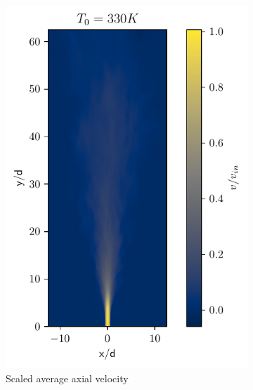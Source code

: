 \begin{figure}[htbp!]
\begin{subfigure}{0.25\textwidth}
	\includegraphics[scale=.65]{figures/Plots/vertical/330/v_scaled_vert_avg_330.pdf}
	\caption{Scaled average axial velocity} \label{330_v_3}
\end{subfigure}
\hfill
\begin{subfigure}{0.25\textwidth}
	\centering

\end{subfigure}
\end{figure}
